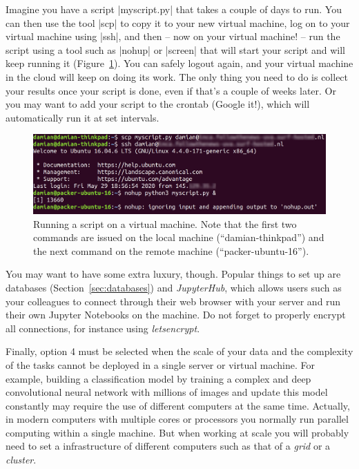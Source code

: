 Imagine you have a script |myscript.py| that takes a couple of days to
run. You can then use the tool |scp| to copy it to your new virtual
machine, log on to your virtual machine using |ssh|, and then -- now
on your virtual machine! -- run the script using a tool such as
|nohup| or |screen| that will start your script and will keep running
it (Figure~\ref{fig:ssh}). You can safely logout again, and your
virtual machine in the cloud will keep on doing its work. The only
thing you need to do is collect your results once your script is done,
even if that's a couple of weeks later. Or you may want to add your
script to the crontab (Google it!), which will automatically run
it at set intervals.

\begin{figure}[!tbp]
  \centering
  \includegraphics[width=\textwidth]{figures/ssh.png}
  \caption{Running a script on a virtual machine\label{fig:ssh}. Note that the first two commands are issued on the local machine (``damian-thinkpad'') and the next command on the remote machine (``packer-ubuntu-16'').}
\end{figure}

You may want to have some extra luxury, though. Popular things to
set up are databases (Section~\ref{sec:databases}) and \emph{JupyterHub}, which
allows users such as your colleagues to connect through their
web browser with your server and run their own Jupyter Notebooks
on the machine. Do not forget to properly encrypt all connections,
for instance using \emph{letsencrypt}.

Finally, option 4 must be selected when the scale of your data and the complexity of the tasks cannot be deployed in a single server or virtual machine. For example, building a classification model by training a complex and deep convolutional neural network with millions of images and update this model constantly may require the use of different computers at the same time. Actually, in modern computers with multiple cores or processors you normally run parallel computing within a single machine. But when working at scale you will probably need to set a infrastructure of different computers such as that of a \textit{grid} or a \textit{cluster}.

